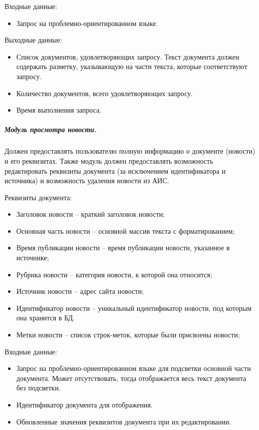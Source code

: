 Входные данные:
\begin{itemize}
\item Запрос на проблемно-ориентированном языке.
\end{itemize}

Выходные данные:
\begin{itemize}
\item Список документов, удовлетворяющих запросу. Текст документа должен содержать разметку, указывающую на части текста, которые соответствуют запросу.
\item Количество документов, всего удовлетворяющих запросу.
\item Время выполнения запроса.
\end{itemize}

\subparagraph{Модуль просмотра новости.} \hfill

Должен предоставлять пользователю полную информацию о документе (новости) и его реквизитах. Также модуль должен предоставлять возможность редактировать реквизиты документа (за исключением идентификатора и источника) и возможность удаления новости из АИС.

Реквизиты документа:
\begin{itemize}
\item Заголовок новости -- краткий заголовок новости;
\item Основная часть новости -- основной массив текста с форматированием;
\item Время публикации новости -- время публикации новости, указанное в
источнике;
\item Рубрика новости -- категория новости, к которой она относится;
\item Источник новости -- адрес сайта новости;
\item Идентификатор новости -- уникальный идентификатор новости, под
которым она хранится в БД.
\item Метки новости -- список строк-меток, которые были присвоены новости;
\end{itemize}

Входные данные:
\begin{itemize}
\item Запрос на проблемно-ориентированном языке для подсветки основной части документа. Может отсутствовать, тогда отображается весь текст документа без подсветки.
\item Идентификатор документа для отображения.
\item Обновленные значения реквизитов документа при их редактировании.
\end{itemize}

